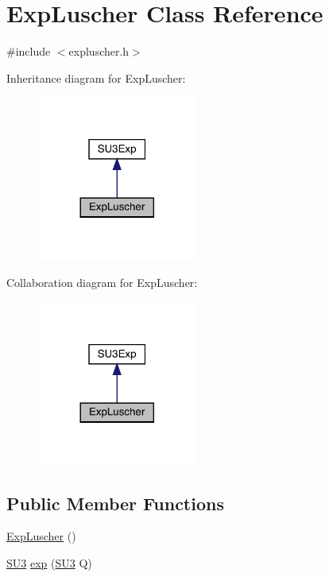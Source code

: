 \hypertarget{class_exp_luscher}{}\section{Exp\+Luscher Class Reference}
\label{class_exp_luscher}


{\ttfamily \#include $<$expluscher.\+h$>$}



Inheritance diagram for Exp\+Luscher\+:\nopagebreak
\begin{figure}[H]
\begin{center}
\leavevmode
\includegraphics[width=149pt]{class_exp_luscher__inherit__graph}
\end{center}
\end{figure}


Collaboration diagram for Exp\+Luscher\+:\nopagebreak
\begin{figure}[H]
\begin{center}
\leavevmode
\includegraphics[width=149pt]{class_exp_luscher__coll__graph}
\end{center}
\end{figure}
\subsection*{Public Member Functions}
\begin{DoxyCompactItemize}
\item 
\mbox{\hyperlink{class_exp_luscher_a32755f1fe29dd538db104db28151d93b}{Exp\+Luscher}} ()
\item 
\mbox{\hyperlink{class_s_u3}{S\+U3}} \mbox{\hyperlink{class_exp_luscher_a8e4c0689c633728527e1220094c664c1}{exp}} (\mbox{\hyperlink{class_s_u3}{S\+U3}} Q)
\end{DoxyCompactItemize}


